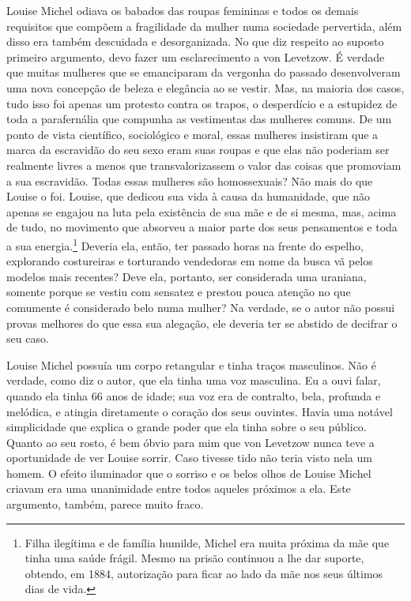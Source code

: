 Louise Michel odiava os babados das roupas femininas e todos os demais
requisitos que compõem a fragilidade da mulher numa sociedade
pervertida, além disso era também descuidada e desorganizada. No que diz
respeito ao suposto primeiro argumento, devo fazer um esclarecimento a
von Levetzow. É verdade que muitas mulheres que se emanciparam da
vergonha do passado desenvolveram uma nova concepção de beleza e
elegância ao se vestir. Mas, na maioria dos casos, tudo isso foi apenas
um protesto contra os trapos, o desperdício e a estupidez de toda a
parafernália que compunha as vestimentas das mulheres comuns. De um
ponto de vista científico, sociológico e moral, essas mulheres
insistiram que a marca da escravidão do seu sexo eram suas roupas e que
elas não poderiam ser realmente livres a menos que transvalorizassem o
valor das coisas que promoviam a sua escravidão. Todas essas mulheres
são homossexuais? Não mais do que Louise o foi. Louise, que dedicou sua
vida à causa da humanidade, que não apenas se engajou na luta pela
existência de sua mãe e de si mesma, mas, acima de tudo, no movimento
que absorveu a maior parte dos seus pensamentos e toda a sua
energia.\footnote{Filha ilegítima e de família humilde, Michel era muita
  próxima da mãe que tinha uma saúde frágil. Mesmo na prisão
  continuou a lhe dar suporte, obtendo, em 1884, autorização para ficar
  ao lado da mãe nos seus últimos dias de vida.} Deveria ela, então, ter
passado horas na frente do espelho, explorando costureiras e torturando
vendedoras em nome da busca vã pelos modelos mais recentes? Deve ela,
portanto, ser considerada uma uraniana, somente porque se vestiu com sensatez e
prestou pouca atenção no que comumente é considerado belo numa mulher?
Na verdade, se o autor não possui provas melhores do que essa sua
alegação, ele deveria ter se abstido de decifrar o seu caso.

Louise Michel possuía um corpo retangular e tinha traços masculinos. Não
é verdade, como diz o autor, que ela tinha uma voz masculina. Eu a ouvi
falar, quando ela tinha 66 anos de idade; sua voz era de contralto,
bela, profunda e melódica, e atingia diretamente o coração dos seus
ouvintes. Havia uma notável simplicidade que explica o grande poder que
ela tinha sobre o seu público. Quanto ao seu rosto, é bem óbvio para mim
que von Levetzow nunca teve a oportunidade de ver Louise sorrir. Caso
tivesse tido não teria visto nela um homem. O efeito iluminador que o
sorriso e os belos olhos de Louise Michel criavam era uma unanimidade
entre todos aqueles próximos a ela. Este argumento, também,
parece muito fraco.

